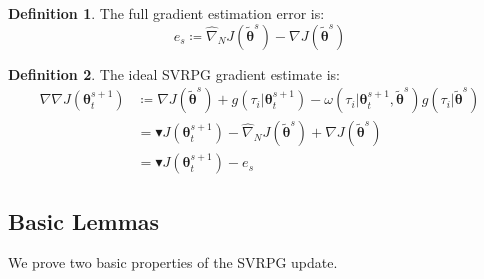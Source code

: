 \documentclass{article}
\theoremstyle{remark}
\theoremstyle{definition}
\newtheorem{definition}{Definition}[section]
\newcommand{\dnabla}{\nabla\!\!\!\!\nabla}
\newcommand{\vtheta}{\boldsymbol{\theta}}
\newcommand{\Reward}{\mathcal{R}}
\newcommand{\gradJ}[1]{\nabla J(#1)}
\newcommand{\gradApp}[2]{\widehat{\nabla}_{#2}J(#1)}
\newcommand{\gradBlack}[1]{\blacktriangledown J(#1)}
\newcommand{\gradIdeal}[1]{\dnabla J(#1)}
\newcommand{\wt}[1]{\widetilde{#1}}
\begin{document}
\begin{definition}
The full gradient estimation error is:
\[
	e_s \coloneqq \gradApp{\wt{\vtheta}^s}{N} - \gradJ{\wt{\vtheta}^s} 
\]
\end{definition}

\begin{definition}\label{def:ideal}
The ideal SVRPG gradient estimate is:
\begin{align*}
	\gradIdeal{\vtheta_t^{s+1}} &\coloneqq 
	\gradJ{\wt{\vtheta}^s}
    + g(\tau_i|\vtheta^{s+1}_t)
    - \omega(\tau_i|\vtheta^{s+1}_t, \wt{\vtheta}^s) g(\tau_i|\wt{\vtheta}^s)
    \\
	&= \gradBlack{\vtheta_t^{s+1}} - \gradApp{\wt{\vtheta}^s}{N} + \gradJ{\wt{\vtheta}^s} \\
	&= \gradBlack{\vtheta_t^{s+1}} - e_s
\end{align*}
\end{definition}


\subsection*{Basic Lemmas}
We prove two basic properties of the SVRPG update.
\end{document}
